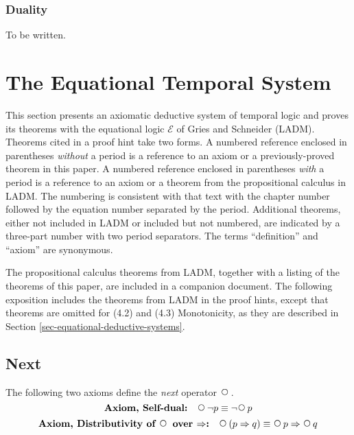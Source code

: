 \documentclass[12pt, fleqn, leqno]{article}
\newcommand{\impl}{\ensuremath{\Rightarrow}}        %
\newcommand{\Next}{\;\,\text{\raisebox{3.5pt}{\circle{6}}}}
\begin{document}
\subsubsection*{Duality}\label{section-duality}

To be written.

\section{The Equational Temporal System}

This section presents an axiomatic deductive system of temporal logic and proves its theorems with the equational
logic $\mathcal{E}$ of Gries and Schneider \cite{LADM} (LADM).
Theorems cited in a proof hint take two forms.
A numbered reference enclosed in parentheses \textit{without} a period is a reference to an axiom or a previously-proved
theorem in this paper.
A numbered reference enclosed in parentheses \textit{with} a period is a reference to an axiom or a
theorem from the propositional calculus in LADM.
The numbering is consistent with that text with the chapter number followed by the equation number separated by the period.
Additional theorems, either not included in LADM or included but not numbered, are indicated by a three-part number with two period separators.
The terms ``definition'' and ``axiom'' are synonymous.

The propositional calculus theorems from LADM, together with a listing of the theorems of this paper, are included in a companion document. \cite{vegaTheorems}
The following exposition includes the theorems from LADM in the proof hints, except that theorems are omitted for (4.2) and (4.3) Monotonicity, as they are described in Section \ref{sec-equational-deductive-systems}.

\subsection{Next}\label{section-next}

The following two axioms define the \textit{next} operator $\Next$.
\begin{equation}\label{E:selfDual}
\textbf{Axiom, Self-dual:}\quad \Next\neg p \equiv \neg\Next p
\end{equation}
\begin{equation}\label{E:distNextImp}
\textbf{Axiom, Distributivity of $\Next$ over $\impl$:}\quad \Next (p \impl q) \equiv \Next p \impl \Next q
\end{equation}
\end{document}
